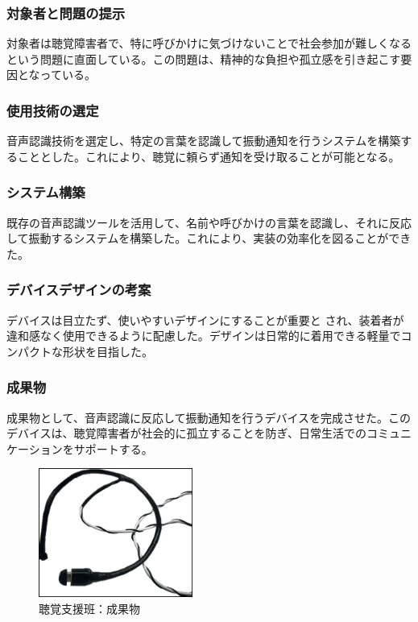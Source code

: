 \subsubsection{対象者と問題の提示}
対象者は聴覚障害者で、特に呼びかけに気づけないことで社会参加が難しくなるという問題に直面している。この問題は、精神的な負担や孤立感を引き起こす要因となっている。
\subsubsection{使用技術の選定}
音声認識技術を選定し、特定の言葉を認識して振動通知を行うシステムを構築することとした。これにより、聴覚に頼らず通知を受け取ることが可能となる。
\subsubsection{システム構築}
既存の音声認識ツールを活用して、名前や呼びかけの言葉を認識し、それに反応して振動するシステムを構築した。これにより、実装の効率化を図ることができた。
\subsubsection{デバイスデザインの考案}
デバイスは目立たず、使いやすいデザインにすることが重要と  され、装着者が違和感なく使用できるように配慮した。デザインは日常的に着用できる軽量でコンパクトな形状を目指した。
\subsubsection{成果物}
成果物として、音声認識に反応して振動通知を行うデバイスを完成させた。このデバイスは、聴覚障害者が社会的に孤立することを防ぎ、日常生活でのコミュニケーションをサポートする。
\begin{figure}[h]
  \centering
  \includegraphics[width=0.45\textwidth]{pages/report/images/Choukakudevice.png}
  \caption{聴覚支援班：成果物}
  \label{fig:Choukakudevice}
\end{figure}
